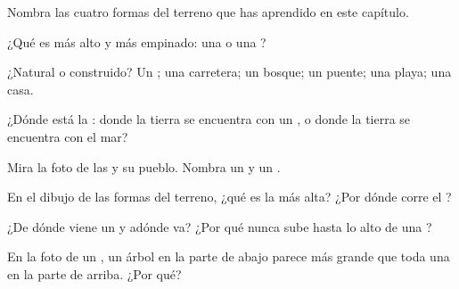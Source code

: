 \begin{exercise}[$\star$]\label{exo:g1:landscapes-around-us:1}
Nombra las cuatro formas del terreno que has aprendido en este capítulo.
\end{exercise}

\begin{exercise}[$\star$]\label{exo:g1:landscapes-around-us:2}
¿Qué es más alto y más empinado: una  o una ?
\end{exercise}

\begin{exercise}[$\star$]\label{exo:g1:landscapes-around-us:3}
¿Natural o construido? Un ; una carretera; un bosque; un puente; una
playa; una casa.
\end{exercise}

\begin{exercise}[$\star$]\label{exo:g1:landscapes-around-us:4}
¿Dónde está la : donde la tierra se encuentra con un , o donde la
tierra se encuentra con el mar?
\end{exercise}

\begin{exercise}[$\star$]\label{exo:g1:landscapes-around-us:5}
Mira la foto de las  y su pueblo. Nombra un  y un
.
\end{exercise}

\begin{exercise}[$\star$]\label{exo:g1:landscapes-around-us:6}
En el dibujo de las formas del terreno, ¿qué  es la más
alta? ¿Por dónde corre el ?
\end{exercise}

\begin{exercise}[$\star\star$]\label{exo:g1:landscapes-around-us:7}
¿De dónde viene un  y adónde va? ¿Por qué nunca sube hasta lo alto de una
?
\end{exercise}

\begin{exercise}[$\star\star$]\label{exo:g1:landscapes-around-us:8}
En la foto de un , un árbol en la parte de abajo parece más grande
que toda una  en la parte de arriba. ¿Por qué?
\end{exercise}

